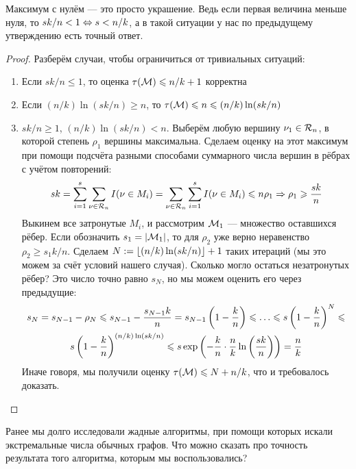 \begin{note}
	Максимум с нулём --- это просто украшение. Ведь если первая величина меньше нуля, то $sk / n < 1 \Leftrightarrow s < n / k$, а в такой ситуации у нас по предыдущему утверждению есть точный ответ.
\end{note}

\begin{proof}
	Разберём случаи, чтобы ограничиться от тривиальных ситуаций:
	\begin{enumerate}
		\item Если $sk / n \le 1$, то оценка $\tau(\mathcal{M}) \leqslant n / k + 1$ корректна
		
		\item Если $(n / k)\ln(sk / n) \ge n$, то $\tau(\mathcal{M}) \leqslant n \leqslant (n / k)\ln(sk / n)$
		
		\item $sk / n \ge 1$, $(n / k)\ln(sk / n) < n$. Выберём любую вершину $\nu_1 \in \mathcal{R}_n$, в которой степень $\rho_1$ вершины максимальна. Сделаем оценку на этот максимум при помощи подсчёта разными способами суммарного числа вершин в рёбрах с учётом повторений:
		\[
			sk = \sum_{i = 1}^s \sum_{\nu \in \mathcal{R}_n} I(\nu \in M_i) = \sum_{\nu \in \mathcal{R}_n} \sum_{i = 1}^s I(\nu \in M_i) \leqslant n\rho_1 \Rightarrow \rho_1 \geqslant \frac{sk}{n}
		\]
		Выкинем все затронутые $M_i$, и рассмотрим $\mathcal{M}_1$ --- множество оставшихся рёбер. Если обозначить $s_1 = |\mathcal{M}_1|$, то для $\rho_2$ уже верно неравенство $\rho_2 \ge s_1k / n$. Сделаем $N := \left\lfloor (n / k)\ln(sk / n) \right\rfloor + 1$ таких итераций (мы это можем за счёт условий нашего случая). Сколько могло остаться незатронутых рёбер? Это число точно равно $s_N$, но мы можем оценить его через предыдущие:
		\begin{multline*}
			s_N = s_{N - 1} - \rho_N \leqslant s_{N - 1} - \frac{s_{N - 1}k}{n} = s_{N - 1}\left(1 - \frac{k}{n}\right) \leqslant \ldots \leqslant s\left(1 - \frac{k}{n}\right)^N \leqslant
			\\
			s\left(1 - \frac{k}{n}\right)^{(n / k)\ln(sk / n)} \leqslant s\exp\left(-\frac{k}{n} \cdot \frac{n}{k}\ln\left(\frac{sk}{n}\right)\right) = \frac{n}{k}
		\end{multline*}
		Иначе говоря, мы получили оценку $\tau(\mathcal{M}) \leqslant N + n / k$, что и требовалось доказать.
	\end{enumerate}
\end{proof}

\begin{note}
	Ранее мы долго исследовали жадные алгоритмы, при помощи которых искали экстремальные числа обычных графов. Что можно сказать про точность результата того алгоритма, которым мы воспользовались?
\end{note}

